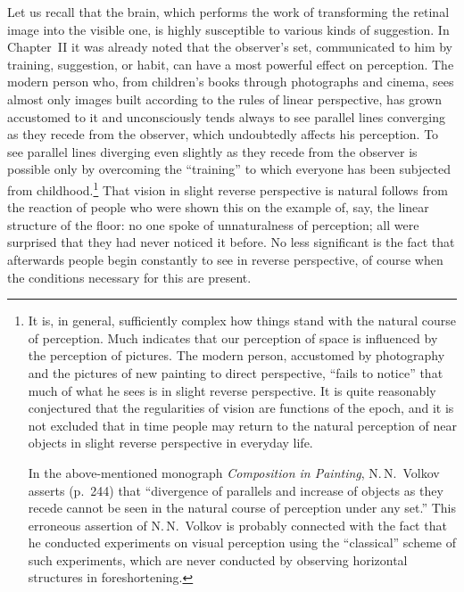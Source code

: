 Let us recall that the brain, which performs the work of transforming the retinal
image into the visible one, is highly susceptible to various kinds of suggestion.  In
Chapter~II it was already noted that the observer's set, communicated to him by
training, suggestion, or habit, can have a most powerful effect on perception.  The
modern person who, from children's books through photographs and cinema, sees almost
only images built according to the rules of linear perspective, has grown accustomed
to it and unconsciously tends always to see parallel lines converging as they recede
from the observer, which undoubtedly affects his perception.  To see parallel lines
diverging even slightly as they recede from the observer is possible only by
overcoming the ``training'' to which everyone has been subjected from
childhood.\footnote{It is, in general, sufficiently complex how things stand with
  the natural course of perception.  Much indicates that our perception of space is
  influenced by the perception of pictures.  The modern person, accustomed by
  photography and the pictures of new painting to direct perspective, ``fails to
  notice'' that much of what he sees is in slight reverse perspective.  It is quite
  reasonably conjectured that the regularities of vision are functions of the epoch,
  and it is not excluded that in time people may return to the natural perception of
  near objects in slight reverse perspective in everyday life.

  In the above-mentioned monograph \emph{Composition in Painting}, N.\,N.~Volkov
  asserts (p.~244) that ``divergence of parallels and increase of objects as they
  recede cannot be seen in the natural course of perception under any set.''  This
  erroneous assertion of N.\,N.~Volkov is probably connected with the fact that he
  conducted experiments on visual perception using the ``classical'' scheme of such
  experiments, which are never conducted by observing horizontal structures in
  foreshortening.}
That vision in slight reverse perspective is natural follows from the reaction of
people who were shown this on the example of, say, the linear structure of the floor:
no one spoke of unnaturalness of perception; all were surprised that they had never
noticed it before.  No less significant is the fact that afterwards people begin
constantly to see in reverse perspective, of course when the conditions necessary for
this are present.



